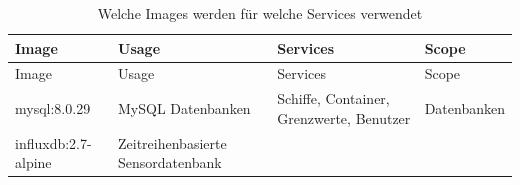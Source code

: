 \documentclass[
    headings=optiontotocandhead,%
    twoside,
    numbers=noenddot,%
    12pt, %
    titlepage, %
    parskip=full, %
    listof=leveldown, 
    numbers=noenddot, %
    a4paper,DIV=14,
    BCOR=15mm,
]{scrbook}
\begin{document}
\begin{longtable}[]{@{}llll@{}}
\caption{Welche Images werden für welche Services
verwendet}\tabularnewline
\toprule
\begin{minipage}[b]{0.22\columnwidth}\raggedright
Image\strut
\end{minipage} & \begin{minipage}[b]{0.22\columnwidth}\raggedright
Usage\strut
\end{minipage} & \begin{minipage}[b]{0.22\columnwidth}\raggedright
Services\strut
\end{minipage} & \begin{minipage}[b]{0.22\columnwidth}\raggedright
Scope\strut
\end{minipage}\tabularnewline
\midrule
\endfirsthead
\toprule
\begin{minipage}[b]{0.22\columnwidth}\raggedright
Image\strut
\end{minipage} & \begin{minipage}[b]{0.22\columnwidth}\raggedright
Usage\strut
\end{minipage} & \begin{minipage}[b]{0.22\columnwidth}\raggedright
Services\strut
\end{minipage} & \begin{minipage}[b]{0.22\columnwidth}\raggedright
Scope\strut
\end{minipage}\tabularnewline
\midrule
\endhead
\begin{minipage}[t]{0.22\columnwidth}\raggedright
mysql:8.0.29\strut
\end{minipage} & \begin{minipage}[t]{0.22\columnwidth}\raggedright
MySQL Datenbanken\strut
\end{minipage} & \begin{minipage}[t]{0.22\columnwidth}\raggedright
Schiffe, Container, Grenzwerte, Benutzer\strut
\end{minipage} & \begin{minipage}[t]{0.22\columnwidth}\raggedright
Datenbanken\strut
\end{minipage}\tabularnewline
\begin{minipage}[t]{0.22\columnwidth}\raggedright
influxdb:2.7-alpine\strut
\end{minipage} & \begin{minipage}[t]{0.22\columnwidth}\raggedright
Zeitreihenbasierte Sensordatenbank\strut
\end{minipage} & \begin{minipage}[t]{0.22\columnwidth}\raggedright

\end{minipage}
\end{longtable}
\end{document}
